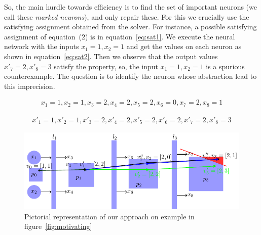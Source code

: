 So, the main hurdle towards efficiency is to find the set of important neurons (we call these {\em marked neurons}), 
and only repair these.  For this we crucially use the satisfying assignment obtained from the \milp{} solver.
For instance, a possible satisfying assignment of equation~(2)%
is in equation~\ref{eq:sat1}. We execute the neural network with the inputs $x_1=1,x_2=1$ and get the values 
on each neuron as shown in equation~\ref{eq:sat2}. 
Then we observe that the output values $x'_7=2, x'_8=3$ satisfy the property, 
so, the input $x_1=1, x_2=1$ is a spurious counterexample. 
The question is to identify the neuron whose abstraction lead to this imprecision. 


 \setcounter{equation}{2}
\begin{equation}
    \begin{aligned}
        x_1=1, x_2=1, x_3=2, x_4=2, x_5=2, x_6=0, x_7=2, x_8=1
    \end{aligned}
\label{eq:sat1}
\end{equation}

\begin{equation}
    \begin{aligned}
        x'_1=1, x'_2=1, x'_3=2, x'_4=2, x'_5=2, x'_6=2, x'_7=2, x'_8=3
    \end{aligned}
\label{eq:sat2}
\end{equation}

\begin{figure}
    \centering
    \includegraphics[scale=0.75]{fig/pictorial1.pdf}
    \caption{Pictorial representation of our approach on example in figure~\ref{fig:motivating}}
    \label{fig:pictorial1}
\end{figure}

